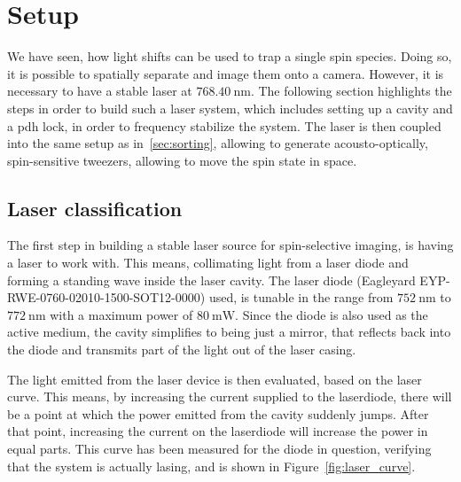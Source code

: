 \section{Setup}

We have seen, how light shifts can be used to trap a single spin species. Doing so, it is possible to spatially separate and image them onto a camera. However, it is necessary to have a stable laser at $\SI{768.40}{\nano\meter}$. The following section highlights the steps in order to build such a laser system, which includes setting up a cavity and a \ac{pdh} lock, in order to frequency stabilize the system. The laser is then coupled into the same setup as in~\ref{sec:sorting}, allowing to generate acousto-optically, spin-sensitive tweezers, allowing to move the spin state in space.

\subsection{Laser classification}

The first step in building a stable laser source for spin-selective imaging, is having a laser to work with. This means, collimating light from a laser diode and forming a standing wave inside the laser cavity. The laser diode (Eagleyard EYP-RWE-0760-02010-1500-SOT12-0000) used, is tunable in the range from $\SI{752}{\nano\meter}$ to $\SI{772}{\nano\meter}$ with a maximum power of $\SI{80}{\milli\watt}$. Since the diode is also used as the active medium, the cavity simplifies to being just a mirror, that reflects back into the diode and transmits part of the light out of the laser casing.

The light emitted from the laser device is then evaluated, based on the laser curve. This means, by increasing the current supplied to the laserdiode, there will be a point at which the power emitted from the cavity suddenly jumps. After that point, increasing the current on the laserdiode will increase the power in equal parts. This curve has been measured for the diode in question, verifying that the system is actually lasing, and is shown in Figure~\ref{fig:laser_curve}.

\begin{figure}[t]%
\end{figure}


